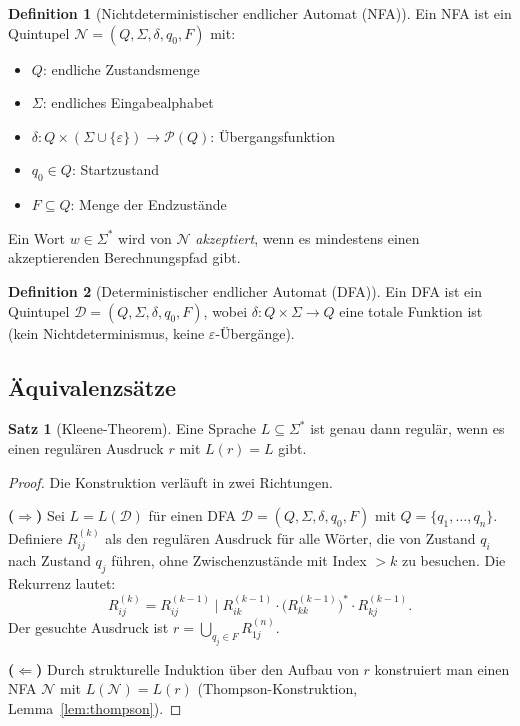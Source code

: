 ﻿\documentclass[a4paper,12pt]{article}
\theoremstyle{definition}
\newtheorem{definition}{Definition}
\newtheorem{satz}{Satz}
\begin{document}
\begin{definition}[Nichtdeterministischer endlicher Automat (NFA)]
	Ein NFA ist ein Quintupel $\mathcal{N} = (Q, \Sigma, \delta, q_0, F)$ mit:
	\begin{itemize}
		\item $Q$: endliche Zustandsmenge
		\item $\Sigma$: endliches Eingabealphabet
		\item $\delta: Q \times (\Sigma \cup \{\varepsilon\}) \to \mathcal{P}(Q)$:
		      Übergangsfunktion
		\item $q_0 \in Q$: Startzustand
		\item $F \subseteq Q$: Menge der Endzustände
	\end{itemize}
	Ein Wort $w \in \Sigma^*$ wird von $\mathcal{N}$ \emph{akzeptiert}, wenn es
	mindestens einen akzeptierenden Berechnungspfad gibt.
\end{definition}

\begin{definition}[Deterministischer endlicher Automat (DFA)]
	Ein DFA ist ein Quintupel $\mathcal{D} = (Q, \Sigma, \delta, q_0, F)$, wobei
	$\delta: Q \times \Sigma \to Q$ eine totale Funktion ist (kein Nichtdeterminismus,
	keine $\varepsilon$-Übergänge).
\end{definition}

\subsection{Äquivalenzsätze}

\begin{satz}[Kleene-Theorem]
	\label{satz:kleene}
	Eine Sprache $L \subseteq \Sigma^*$ ist genau dann regulär, wenn es einen
	regulären Ausdruck $r$ mit $L(r) = L$ gibt.
\end{satz}

\begin{proof}
	Die Konstruktion verläuft in zwei Richtungen.

	\textbf{($\Rightarrow$)} Sei $L = L(\mathcal{D})$ für einen DFA
	$\mathcal{D} = (Q, \Sigma, \delta, q_0, F)$ mit $Q = \{q_1, \ldots, q_n\}$.
	Definiere $R_{ij}^{(k)}$ als den regulären Ausdruck für alle Wörter, die von
	Zustand $q_i$ nach Zustand $q_j$ führen, ohne Zwischenzustände mit Index
	$> k$ zu besuchen. Die Rekurrenz lautet:
	\[
		R_{ij}^{(k)} = R_{ij}^{(k-1)} \mid R_{ik}^{(k-1)} \cdot
		\bigl(R_{kk}^{(k-1)}\bigr)^* \cdot R_{kj}^{(k-1)}.
	\]
	Der gesuchte Ausdruck ist $r = \bigcup_{q_j \in F} R_{1j}^{(n)}$.

	\textbf{($\Leftarrow$)} Durch strukturelle Induktion über den Aufbau von $r$
	konstruiert man einen NFA $\mathcal{N}$ mit $L(\mathcal{N}) = L(r)$
	(Thompson-Konstruktion, Lemma~\ref{lem:thompson}). \qedhere
\end{proof}
\end{document}
